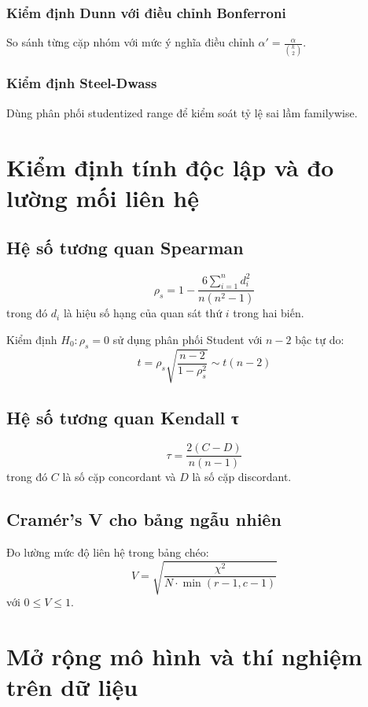 \subsubsection*{Kiểm định Dunn với điều chỉnh Bonferroni}
So sánh từng cặp nhóm với mức ý nghĩa điều chỉnh $\alpha' = \frac{\alpha}{\binom{k}{2}}$.

\subsubsection*{Kiểm định Steel-Dwass}
Dùng phân phối studentized range để kiểm soát tỷ lệ sai lầm familywise.

\section{Kiểm định tính độc lập và đo lường mối liên hệ}

\subsection{Hệ số tương quan Spearman}
\begin{dn}
\[
\rho_s = 1 - \frac{6\sum_{i=1}^n d_i^2}{n(n^2-1)}
\]
trong đó $d_i$ là hiệu số hạng của quan sát thứ $i$ trong hai biến.
\end{dn}

Kiểm định $H_0: \rho_s = 0$ sử dụng phân phối Student với $n-2$ bậc tự do:
\[
t = \rho_s \sqrt{\frac{n-2}{1-\rho_s^2}} \sim t(n-2)
\]

\subsection{Hệ số tương quan Kendall τ}
\begin{dn}
\[
\tau = \frac{2(C-D)}{n(n-1)}
\]
trong đó $C$ là số cặp concordant và $D$ là số cặp discordant.
\end{dn}

\subsection{Cramér's V cho bảng ngẫu nhiên}
Đo lường mức độ liên hệ trong bảng chéo:
\[
V = \sqrt{\frac{\chi^2}{N \cdot \min(r-1, c-1)}}
\]
với $0 \leq V \leq 1$.

\section{Mở rộng mô hình và thí nghiệm trên dữ liệu}

